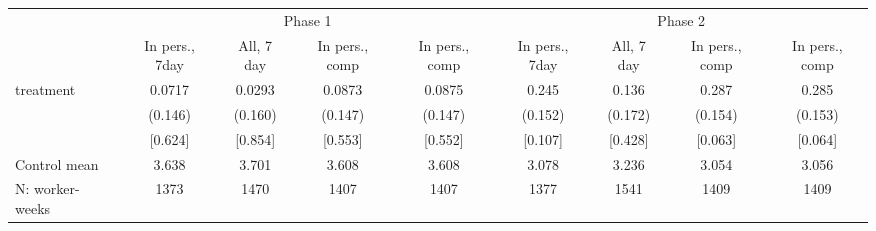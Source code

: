 \begin{tabular}{l*{8}{c}}
\toprule
            &\multicolumn{4}{c}{Phase 1}                        &\multicolumn{4}{c}{Phase 2}                        \\\cmidrule(lr){2-5}\cmidrule(lr){6-9}
            &\multicolumn{1}{c}{In pers., 7day}&\multicolumn{1}{c}{All, 7 day}&\multicolumn{1}{c}{In pers., comp}&\multicolumn{1}{c}{In pers., comp}&\multicolumn{1}{c}{In pers., 7day}&\multicolumn{1}{c}{All, 7 day}&\multicolumn{1}{c}{In pers., comp}&\multicolumn{1}{c}{In pers., comp}\\
\midrule
treatment   &      0.0717&      0.0293&      0.0873&      0.0875&       0.245&       0.136&       0.287&       0.285\\
            &     (0.146)&     (0.160)&     (0.147)&     (0.147)&     (0.152)&     (0.172)&     (0.154)&     (0.153)\\
            &     [0.624]&     [0.854]&     [0.553]&     [0.552]&     [0.107]&     [0.428]&     [0.063]&     [0.064]\\
\midrule
Control mean&       3.638&       3.701&       3.608&       3.608&       3.078&       3.236&       3.054&       3.056\\
N: worker-weeks&        1373&        1470&        1407&        1407&        1377&        1541&        1409&        1409\\
\bottomrule
\end{tabular}
